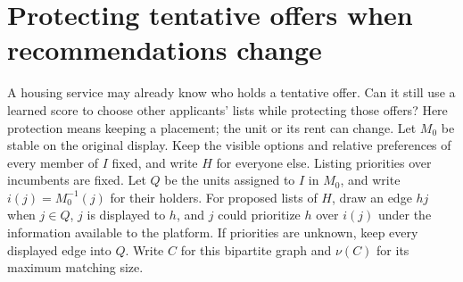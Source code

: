 \section{Protecting tentative offers when recommendations change}\label{app:protect-detail}
A housing service may already know who holds a tentative offer. Can it still use
a learned score to choose other applicants' lists while protecting those offers?
Here protection means keeping a placement; the unit or its rent can change.
Let $M_0$ be stable on the original display. Keep the visible options and
relative preferences of every member of $I$ fixed, and write $H$ for everyone
else. Listing priorities over incumbents are fixed. Let $Q$ be the units
assigned to $I$ in $M_0$, and write $i(j)=M_0^{-1}(j)$ for their holders.
For proposed lists of $H$, draw an edge $hj$ when $j\in Q$, $j$ is displayed
to $h$, and $j$ could prioritize $h$ over $i(j)$ under the information available
to the platform. If priorities are unknown, keep every displayed edge into $Q$.
Write $C$ for this bipartite graph and $\nu(C)$ for its maximum matching size.

